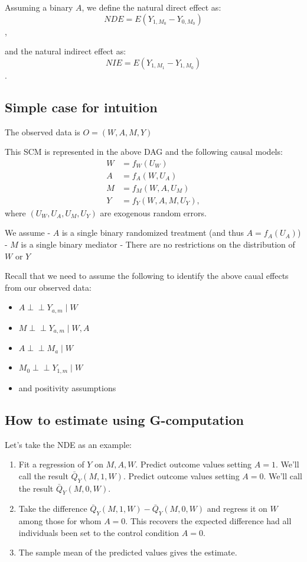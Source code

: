 \documentclass[
  12pt,
]{book}
\providecommand{\tightlist}{%
  \setlength{\itemsep}{0pt}\setlength{\parskip}{0pt}}
\theoremstyle{definition}
\theoremstyle{definition}
\theoremstyle{definition}
\newcommand{\indep}{\mbox{$\perp\!\!\!\perp$}}
\newcommand{\1}{\mathbbm{1}}
\begin{document}
Assuming a binary \(A\), we define the natural direct effect as:
\[NDE = E(Y_{1,M_{0}} - Y_{0,M_{0}})\],

and the natural indirect effect as:
\[NIE = E(Y_{1,M_{1}} - Y_{1,M_{0}})\].

\hypertarget{simple-case-for-intuition}{%
\subsection{Simple case for intuition}\label{simple-case-for-intuition}}

The observed data is \(O=(W, A, M, Y)\)

This SCM is represented in the above DAG and the following causal models:
\begin{align*}
  W & = f_W(U_W)\\
  A & = f_A(W, U_A)\\
  M & = f_M(W, A, U_M)\\
  Y & = f_Y(W, A, M, U_Y),
\end{align*}
where \((U_W, U_A,U_M, U_Y)\) are exogenous random errors.

We assume
- \(A\) is a single binary randomized treatment (and thus \(A = f_A(U_A)\))
- \(M\) is a single binary mediator
- There are no restrictions on the distribution of \(W\) or \(Y\)

Recall that we need to assume the following to identify the above caual effects
from our observed data:

\begin{itemize}
\tightlist
\item
  \(A \indep Y_{a,m} \mid W\)
\item
  \(M \indep Y_{a,m} \mid W, A\)
\item
  \(A \indep M_a \mid W\)
\item
  \(M_0 \indep Y_{1,m} \mid W\)
\item
  and positivity assumptions
\end{itemize}

\hypertarget{how-to-estimate-using-g-computation}{%
\subsection{How to estimate using G-computation}\label{how-to-estimate-using-g-computation}}

Let's take the NDE as an example:

\begin{enumerate}
\def\labelenumi{\arabic{enumi}.}
\tightlist
\item
  Fit a regression of \(Y\) on \(M,A,W\). Predict outcome values setting \(A=1\).
  We'll call the result \(\bar{Q}_Y(M,1,W)\). Predict outcome values setting
  \(A=0\). We'll call the result \(\bar{Q}_Y(M,0,W)\).
\item
  Take the difference \(\bar{Q}_Y(M,1,W) - \bar{Q}_Y(M,0,W)\) and regress it on
  \(W\) among those for whom \(A=0\). This recovers the expected difference had all
  individuals been set to the control condition \(A = 0\).
\item
  The sample mean of the predicted values gives the estimate.
\end{enumerate}
\end{document}
